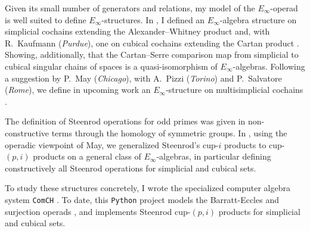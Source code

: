 Given its small number of generators and relations, my model of the $E_\infty$-operad is well suited to define $E_{\infty}$-structures.
In \cite{medina2020prop1}, I defined an $E_\infty$-algebra structure on simplicial cochains extending the Alexander--Whitney product and, with R.~Kaufmann (\textit{Purdue}), one on cubical cochains extending the Cartan product \cite{medina2021cubical}.
Showing, additionally, that the Cartan--Serre comparison map from simplicial to cubical singular chains of spaces is a quasi-isomorphism of $E_\infty$-algebras.
Following a suggestion by P.~May (\textit{Chicago}), with A.~Pizzi (\textit{Torino}) and P.~Salvatore (\textit{Rome}), we define in upcoming work an $E_\infty$-structure on multisimplicial cochains \cite{medina2021multisimplicial}.

The definition of Steenrod operations for odd primes was given in non-constructive terms through the homology of symmetric groups.
In \cite{medina2020maysteenrod}, using the operadic viewpoint of May, we generalized Steenrod's cup-$i$ products to cup-$(p,i)$ products on a general class of $E_\infty$-algebras, in particular defining constructively all Steenrod operations for simplicial and cubical sets.

To study these structures concretely, I wrote the specialized computer algebra system \texttt{ComCH} \cite{medina2021computer}.
To date, this \texttt{Python} project models the Barratt-Eccles and surjection operads \cite{mcclure2003multivariable,berger2004combinatorial}, and implements Steenrod cup-$(p,i)$ products for simplicial and cubical sets.